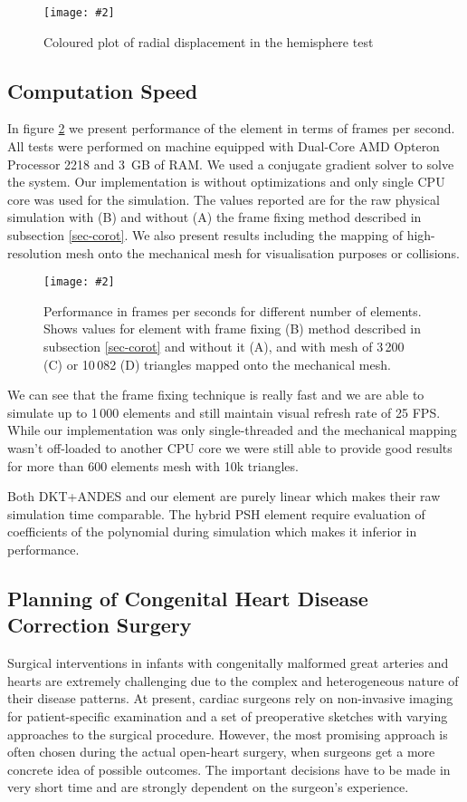 \documentclass{egpubl}
\newcommand{\Figure}[3]{%
\begin{figure}[htb]
  \centering
  \texttt{[image: \#2]}
  \caption{\label{fig-#2}#3}
\end{figure}}
\begin{document}
\Figure{\linewidth}{hemisphere-img}
{Coloured plot of radial displacement in the hemisphere test}


\subsection{Computation Speed}\label{sec-fps} %

In figure \ref{fig-fps} we present performance of the element in terms of
frames per second. All tests were performed on machine equipped with Dual-Core
AMD Opteron Processor 2218 and 3~GB of RAM. We used a conjugate gradient solver
to solve the system. Our implementation is without optimizations
and only single CPU core was used for the
simulation. The values reported are for the raw physical simulation with (B)
and without (A) the frame fixing method described in subsection
\ref{sec-corot}. We also present results including the mapping of
high-resolution mesh onto the mechanical mesh for visualisation purposes or
collisions.

\Figure{\linewidth}{fps}
{Performance in frames per seconds for different number of elements. Shows
values for element with frame fixing (B) method described in subsection
\ref{sec-corot} and without it (A), and with mesh of 3\,200
(C) or 10\,082 (D) triangles mapped onto the mechanical mesh.}

We can see that the frame fixing technique is really fast and we are able
to simulate up to 1\,000 elements and still maintain visual refresh rate of
25 FPS. While our implementation was only single-threaded and the mechanical mapping
wasn't off-loaded to another CPU core we were still able to provide good
results for more than 600 elements mesh with 10k triangles.

Both DKT+ANDES and our element are purely linear which makes their raw
simulation time comparable. The hybrid PSH element require evaluation of
coefficients of the polynomial during simulation which makes it inferior in
performance.



\subsection{Planning of Congenital Heart Disease Correction Surgery} %

Surgical interventions in infants with congenitally malformed great arteries
and hearts are extremely challenging due to the complex and heterogeneous
nature of their disease patterns. At present, cardiac surgeons rely on
non-invasive imaging for patient-specific examination and a set of preoperative
sketches with varying approaches to the surgical procedure. However, the most
promising approach is often chosen during the actual open-heart surgery, when
surgeons get a more concrete idea of possible outcomes.
The important decisions have to be made in very
short time and are strongly dependent on the surgeon's experience.
\end{document}
